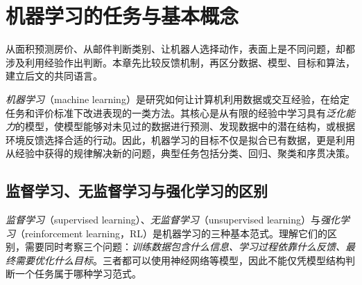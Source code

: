 \setcounter{chapter}{0} %
\chapter{机器学习的任务与基本概念}
\label{chap:ml-tasks}

从面积预测房价、从邮件判断类别、让机器人选择动作，表面上是不同问题，却都涉及利用经验作出判断。本章先比较反馈机制，再区分数据、模型、目标和算法，建立后文的共同语言。

\emph{机器学习}（machine learning）是研究如何让计算机利用数据或交互经验，在给定任务和评价标准下改进表现的一类方法。其核心是从有限的经验中学习具有\emph{泛化能力}的模型，使模型能够对未见过的数据进行预测、发现数据中的潜在结构，或根据环境反馈选择合适的行动。因此，机器学习的目标不仅是拟合已有数据，更是利用从经验中获得的规律解决新的问题，典型任务包括分类、回归、聚类和序贯决策。

\section{监督学习、无监督学习与强化学习的区别}
\label{sec:learning-paradigms}

\emph{监督学习}（supervised learning）、\emph{无监督学习}（unsupervised learning）与\emph{强化学习}（reinforcement learning，RL）是机器学习的三种基本范式。理解它们的区别，需要同时考察三个问题：\emph{训练数据包含什么信息、学习过程依靠什么反馈、最终需要优化什么目标}。三者都可以使用神经网络等模型，因此不能仅凭模型结构判断一个任务属于哪种学习范式。

